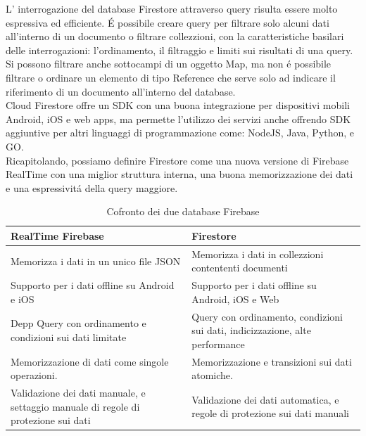 L' interrogazione del database Firestore attraverso query risulta essere molto espressiva ed efficiente. \'E possibile creare query per filtrare solo alcuni dati all'interno di un documento o filtrare collezzioni, con la caratteristiche basilari delle interrogazioni: l'ordinamento, il filtraggio e limiti sui risultati di una query. Si possono filtrare anche sottocampi di un oggetto Map, ma non \'e possibile filtrare o ordinare un elemento di tipo Reference che serve solo ad indicare il riferimento di un documento all'interno del database.\\
Cloud Firestore offre un SDK con una buona integrazione per dispositivi mobili Android, iOS e web apps, ma permette l'utilizzo dei servizi anche offrendo SDK aggiuntive per altri linguaggi di programmazione come: NodeJS, Java, Python, e GO.\\


Ricapitolando, possiamo definire Firestore come una nuova versione di Firebase RealTime con una miglior struttura interna, una buona memorizzazione dei dati e una espressivit\'a della query maggiore.

\begin{table}[h]
\begin{center}

\begin{tabular}{|p{7cm}|p{7cm}|}
    \hline
    \textbf{RealTime Firebase} & \textbf{Firestore} \\ \hline
    Memorizza i dati in un unico file JSON & Memorizza i dati in collezzioni contententi documenti \\ \hline
    Supporto per i dati offline su Android e iOS & Supporto per i dati offline su Android, iOS e Web \\ \hline
    Depp Query con ordinamento e condizioni sui dati limitate & Query con ordinamento, condizioni sui dati, indicizzazione, alte performance \\ \hline
    Memorizzazione di dati come singole operazioni. & Memorizzazione e transizioni sui dati atomiche.\\ \hline
    Validazione dei dati manuale, e settaggio manuale di regole di protezione sui dati &  Validazione dei dati automatica, e regole di protezione sui dati manuali\\
\hline
\end{tabular}
\caption[Firebase vs Firestore ]{Cofronto dei due database Firebase}\label{tab:FirestorevSFirebase}
\end{center}
\end{table}



